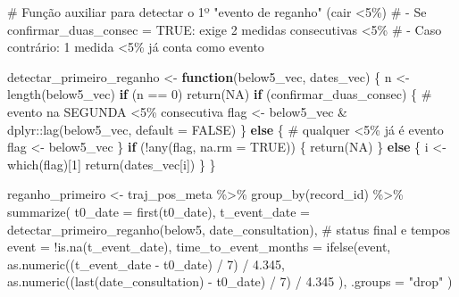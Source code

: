 \documentclass[
]{article}
\newenvironment{Shaded}{\begin{snugshade}}{\end{snugshade}}
\newcommand{\AttributeTok}[1]{\textcolor[rgb]{0.40,0.45,0.13}{#1}}
\newcommand{\CommentTok}[1]{\textcolor[rgb]{0.37,0.37,0.37}{#1}}
\newcommand{\ConstantTok}[1]{\textcolor[rgb]{0.56,0.35,0.01}{#1}}
\newcommand{\ControlFlowTok}[1]{\textcolor[rgb]{0.00,0.23,0.31}{\textbf{#1}}}
\newcommand{\DecValTok}[1]{\textcolor[rgb]{0.68,0.00,0.00}{#1}}
\newcommand{\FloatTok}[1]{\textcolor[rgb]{0.68,0.00,0.00}{#1}}
\newcommand{\FunctionTok}[1]{\textcolor[rgb]{0.28,0.35,0.67}{#1}}
\newcommand{\NormalTok}[1]{\textcolor[rgb]{0.00,0.23,0.31}{#1}}
\newcommand{\OtherTok}[1]{\textcolor[rgb]{0.00,0.23,0.31}{#1}}
\newcommand{\SpecialCharTok}[1]{\textcolor[rgb]{0.37,0.37,0.37}{#1}}
\newcommand{\StringTok}[1]{\textcolor[rgb]{0.13,0.47,0.30}{#1}}
\begin{document}
\begin{Shaded}
\begin{Highlighting}[]
\CommentTok{\# Função auxiliar para detectar o 1º "evento de reganho" (cair \textless{}5\%)}
\CommentTok{\#   {-} Se confirmar\_duas\_consec = TRUE: exige 2 medidas consecutivas \textless{}5\%}
\CommentTok{\#   {-} Caso contrário: 1 medida \textless{}5\% já conta como evento}

\NormalTok{detectar\_primeiro\_reganho }\OtherTok{\textless{}{-}} \ControlFlowTok{function}\NormalTok{(below5\_vec, dates\_vec) \{}
\NormalTok{  n }\OtherTok{\textless{}{-}} \FunctionTok{length}\NormalTok{(below5\_vec)}
  \ControlFlowTok{if}\NormalTok{ (n }\SpecialCharTok{==} \DecValTok{0}\NormalTok{) }\FunctionTok{return}\NormalTok{(}\ConstantTok{NA}\NormalTok{)}
  \ControlFlowTok{if}\NormalTok{ (confirmar\_duas\_consec) \{}
    \CommentTok{\# evento na SEGUNDA \textless{}5\% consecutiva}
\NormalTok{    flag }\OtherTok{\textless{}{-}}\NormalTok{ below5\_vec }\SpecialCharTok{\&}\NormalTok{ dplyr}\SpecialCharTok{::}\FunctionTok{lag}\NormalTok{(below5\_vec, }\AttributeTok{default =} \ConstantTok{FALSE}\NormalTok{)}
\NormalTok{  \} }\ControlFlowTok{else}\NormalTok{ \{}
    \CommentTok{\# qualquer \textless{}5\% já é evento}
\NormalTok{    flag }\OtherTok{\textless{}{-}}\NormalTok{ below5\_vec}
\NormalTok{  \}}
  \ControlFlowTok{if}\NormalTok{ (}\SpecialCharTok{!}\FunctionTok{any}\NormalTok{(flag, }\AttributeTok{na.rm =} \ConstantTok{TRUE}\NormalTok{)) \{}
    \FunctionTok{return}\NormalTok{(}\ConstantTok{NA}\NormalTok{)}
\NormalTok{  \} }\ControlFlowTok{else}\NormalTok{ \{}
\NormalTok{    i }\OtherTok{\textless{}{-}} \FunctionTok{which}\NormalTok{(flag)[}\DecValTok{1}\NormalTok{]}
    \FunctionTok{return}\NormalTok{(dates\_vec[i])}
\NormalTok{  \}}
\NormalTok{\}}

\NormalTok{reganho\_primeiro }\OtherTok{\textless{}{-}}\NormalTok{ traj\_pos\_meta }\SpecialCharTok{\%\textgreater{}\%}
  \FunctionTok{group\_by}\NormalTok{(record\_id) }\SpecialCharTok{\%\textgreater{}\%}
  \FunctionTok{summarize}\NormalTok{(}
    \AttributeTok{t0\_date      =} \FunctionTok{first}\NormalTok{(t0\_date),}
    \AttributeTok{t\_event\_date =} \FunctionTok{detectar\_primeiro\_reganho}\NormalTok{(below5, date\_consultation),}
    \CommentTok{\# status final e tempos}
    \AttributeTok{event        =} \SpecialCharTok{!}\FunctionTok{is.na}\NormalTok{(t\_event\_date),}
    \AttributeTok{time\_to\_event\_months =} \FunctionTok{ifelse}\NormalTok{(event,}
                                  \FunctionTok{as.numeric}\NormalTok{((t\_event\_date }\SpecialCharTok{{-}}\NormalTok{ t0\_date) }\SpecialCharTok{/} \DecValTok{7}\NormalTok{) }\SpecialCharTok{/} \FloatTok{4.345}\NormalTok{,}
                                  \FunctionTok{as.numeric}\NormalTok{((}\FunctionTok{last}\NormalTok{(date\_consultation) }\SpecialCharTok{{-}}\NormalTok{ t0\_date) }\SpecialCharTok{/} \DecValTok{7}\NormalTok{) }\SpecialCharTok{/} \FloatTok{4.345}
\NormalTok{                                  ),}
    \AttributeTok{.groups =} \StringTok{"drop"}
\NormalTok{  )}
\end{Highlighting}
\end{Shaded}
\end{document}
